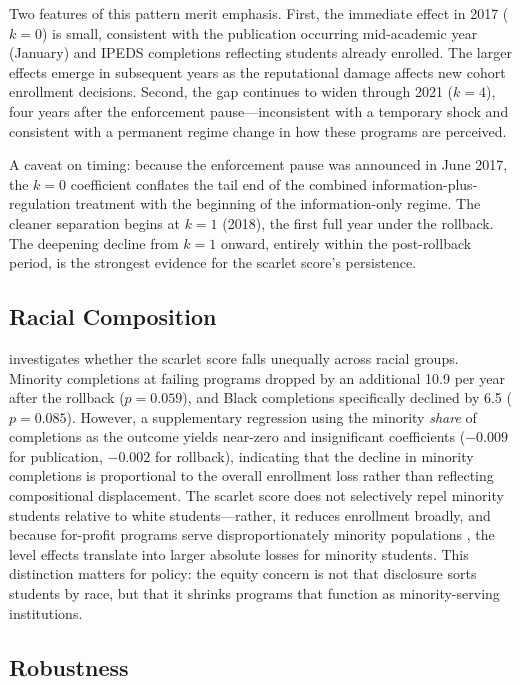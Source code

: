 \documentclass[12pt]{article}
\begin{document}
Two features of this pattern merit emphasis. First, the immediate effect in 2017 ($k = 0$) is small, consistent with the publication occurring mid-academic year (January) and IPEDS completions reflecting students already enrolled. The larger effects emerge in subsequent years as the reputational damage affects new cohort enrollment decisions. Second, the gap continues to widen through 2021 ($k = 4$), four years after the enforcement pause---inconsistent with a temporary shock and consistent with a permanent regime change in how these programs are perceived.

A caveat on timing: because the enforcement pause was announced in June 2017, the $k = 0$ coefficient conflates the tail end of the combined information-plus-regulation treatment with the beginning of the information-only regime. The cleaner separation begins at $k = 1$ (2018), the first full year under the rollback. The deepening decline from $k = 1$ onward, entirely within the post-rollback period, is the strongest evidence for the scarlet score's persistence.

\subsection{Racial Composition}



 investigates whether the scarlet score falls unequally across racial groups. Minority completions at failing programs dropped by an additional 10.9 per year after the rollback ($p = 0.059$), and Black completions specifically declined by 6.5 ($p = 0.085$). However, a supplementary regression using the minority \textit{share} of completions as the outcome yields near-zero and insignificant coefficients ($-0.009$ for publication, $-0.002$ for rollback), indicating that the decline in minority completions is proportional to the overall enrollment loss rather than reflecting compositional displacement. The scarlet score does not selectively repel minority students relative to white students---rather, it reduces enrollment broadly, and because for-profit programs serve disproportionately minority populations \citep{deming2012for}, the level effects translate into larger absolute losses for minority students. This distinction matters for policy: the equity concern is not that disclosure sorts students by race, but that it shrinks programs that function as minority-serving institutions.

\subsection{Robustness}
\end{document}
